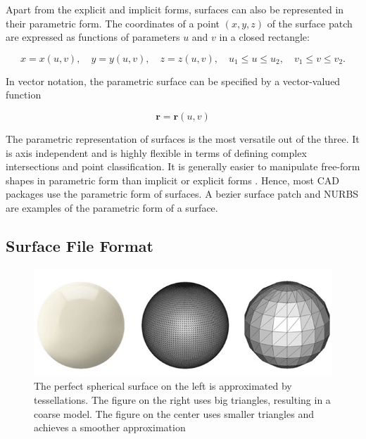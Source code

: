 Apart from the explicit and implicit forms, surfaces can also be represented in their parametric form. The coordinates of a point $(x,y,z)$ of the surface patch are expressed as functions of parameters $u$ and $v$ in a closed rectangle:

\begin{equation}
x=x(u, v), \quad y=y(u, v), \quad z=z(u, v), \quad u_{1} \leq u \leq u_{2}, \quad v_{1} \leq v \leq v_{2}.
\end{equation}

In vector notation, the parametric surface can be specified by a vector-valued function

\begin{equation}
\mathbf{r}=\mathbf{r}(u, v)
\end{equation}

The parametric representation of surfaces is the most versatile out of the three. It is axis independent and is highly flexible in terms of defining complex intersections and point classification. It is generally easier to manipulate free-form shapes in parametric form than implicit or explicit forms  \cite{patrikalakis2009shape}. Hence, most CAD packages use the parametric form of surfaces. A bezier surface patch and NURBS are examples of the parametric form of a surface.

\subsection{Surface File Format}
\label{surfaceFileFormat}

\begin{figure}
  \centering
  \includegraphics[width=\linewidth]{img/m1/tessellation.png}
  \caption{The perfect spherical surface on the left is approximated by tessellations. The figure on the right uses big triangles, resulting in a coarse model. The figure on the center uses smaller triangles and achieves a smoother approximation \cite{fileFormat}}
  \label{fig-tesellation}
\end{figure}


